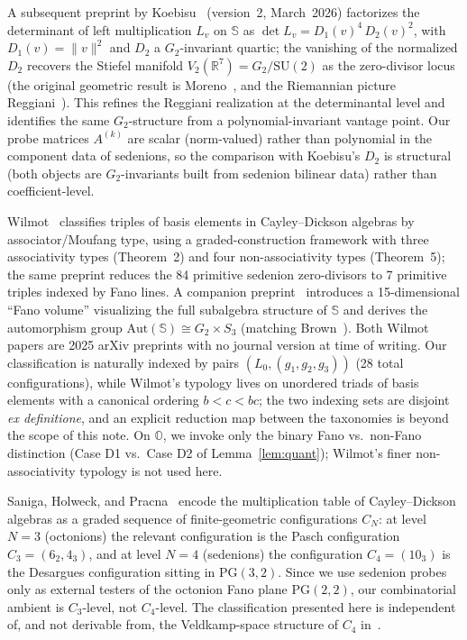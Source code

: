 \documentclass[12pt,a4paper]{article}
\begin{document}
A subsequent preprint by Koebisu~\cite{koebisu2025} (version~2, March~2026) factorizes the determinant of left multiplication $L_v$ on $\mathbb{S}$ as $\det L_v = D_1(v)^4 \, D_2(v)^2$, with $D_1(v) = \|v\|^2$ and $D_2$ a $G_2$-invariant quartic; the vanishing of the normalized $D_2$ recovers the Stiefel manifold $V_2(\mathbb{R}^7) = G_2/\mathrm{SU}(2)$ as the zero-divisor locus (the original geometric result is Moreno~\cite{moreno1998}, and the Riemannian picture Reggiani~\cite{reggiani2024}). This refines the Reggiani realization at the determinantal level and identifies the same $G_2$-structure from a polynomial-invariant vantage point. Our probe matrices $A^{(k)}$ are scalar (norm-valued) rather than polynomial in the component data of sedenions, so the comparison with Koebisu's $D_2$ is structural (both objects are $G_2$-invariants built from sedenion bilinear data) rather than coefficient-level.

Wilmot~\cite{wilmot2025structure} classifies triples of basis elements in Cayley--Dickson algebras by associator/Moufang type, using a graded-construction framework with three associativity types (Theorem~2) and four non-associativity types (Theorem~5); the same preprint reduces the 84 primitive sedenion zero-divisors to 7 primitive triples indexed by Fano lines. A companion preprint~\cite{wilmot2025auto} introduces a 15-dimensional ``Fano volume'' visualizing the full subalgebra structure of $\mathbb{S}$ and derives the automorphism group $\mathrm{Aut}(\mathbb{S}) \cong G_2 \times S_3$ (matching Brown~\cite{brown1967}). Both Wilmot papers are 2025 arXiv preprints with no journal version at time of writing. Our classification is naturally indexed by pairs $(L_0, (g_1, g_2, g_3))$ (28 total configurations), while Wilmot's typology lives on unordered triads of basis elements with a canonical ordering $b < c < bc$; the two indexing sets are disjoint \emph{ex definitione}, and an explicit reduction map between the taxonomies is beyond the scope of this note. On $\mathbb{O}$, we invoke only the binary Fano vs.\ non-Fano distinction (Case D1 vs.\ Case D2 of Lemma~\ref{lem:quant}); Wilmot's finer non-associativity typology is not used here.

Saniga, Holweck, and Pracna~\cite{saniga2015} encode the multiplication table of Cayley--Dickson algebras as a graded sequence of finite-geometric configurations $C_N$: at level $N=3$ (octonions) the relevant configuration is the Pasch configuration $C_3 = (6_2, 4_3)$, and at level $N=4$ (sedenions) the configuration $C_4 = (10_3)$ is the Desargues configuration sitting in $\mathrm{PG}(3,2)$. Since we use sedenion probes only as external testers of the octonion Fano plane $\mathrm{PG}(2,2)$, our combinatorial ambient is $C_3$-level, not $C_4$-level. The classification presented here is independent of, and not derivable from, the Veldkamp-space structure of $C_4$ in~\cite{saniga2015}.
\end{document}
